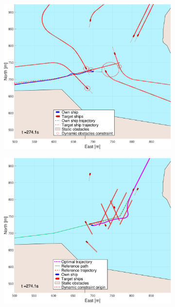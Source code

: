 \begin{figure}[ht!]\ContinuedFloat
    \begin{subfigure}[b]{0.494\textwidth}
        \centering
        \includegraphics[width=\textwidth]{Images/NewFigures/Trheimfjord/_Simple_1fig1_time=275}
        \subcaption{}
    \end{subfigure}
    \hfill
    \begin{subfigure}[b]{0.494\textwidth}
        \centering
        \includegraphics[width=\textwidth]{Images/NewFigures/Trheimfjord/_Simple_1fig999_time=275}

\end{subfigure}
\end{figure}

